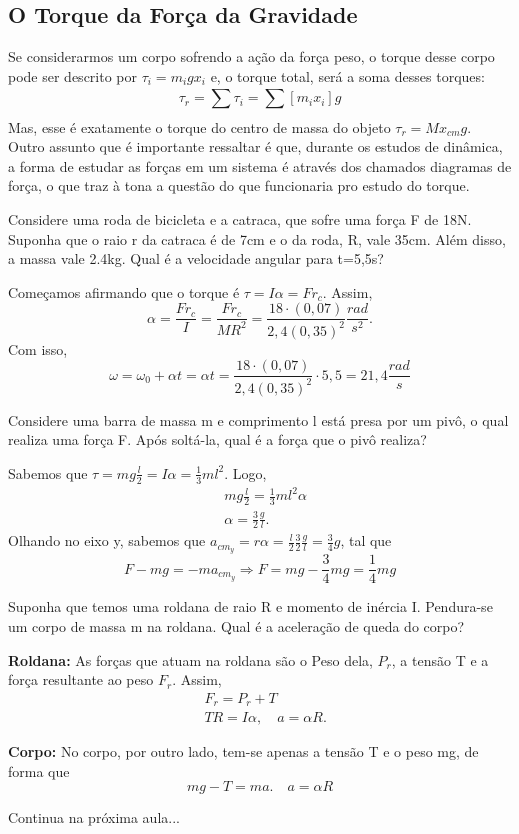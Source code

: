 \documentclass[PhysicsII/physicsII_notes.tex]{subfiles}
\begin{document}
\subsection{O Torque da Força da Gravidade}
Se considerarmos um corpo sofrendo a ação da força peso, o torque desse corpo pode ser descrito por
\(\tau_{i} = m_{i}gx_{i}\) e, o torque total, será a soma desses torques:
\[
	\tau_{r} = \sum\limits_{}^{}\tau_{i} = \sum\limits_{}^{}[m_{i}x_{i}]g
\]
Mas, esse é exatamente o torque do centro de massa do objeto \(\tau_{r} = Mx_{cm}g\). Outro assunto que é
importante ressaltar é que, durante os estudos de dinâmica, a forma de estudar as forças em um sistema é através
dos chamados diagramas de força, o que traz à tona a questão do que funcionaria pro estudo do torque.
\begin{example}
	Considere uma roda de bicicleta e a catraca, que sofre uma força F de 18N. Suponha que o raio r
	da catraca é de 7cm e o da roda, R, vale 35cm. Além disso, a massa vale 2.4kg. Qual é a velocidade angular para t=5,5s?

	Começamos afirmando que o torque é \(\tau = I\alpha = Fr_{c}\). Assim,
	\[
		\alpha = \frac{Fr_{c}}{I} = \frac{Fr_{c}}{MR^{2}} = \frac{18 \cdot (0,07)}{2,4(0,35)^{2}}\frac{rad}{s^{2}}.
	\]
	Com isso,
	\[
		\omega = \omega_{0} + \alpha t = \alpha t = \frac{18 \cdot (0,07)}{2,4(0,35)^{2}} \cdot 5,5 = 21,4 \frac{rad}{s}
	\]
\end{example}
\begin{example}
	Considere uma barra de massa m e comprimento l está presa por um pivô, o qual realiza uma força F. Após soltá-la, qual é a força que o pivô realiza?

	Sabemos que \(\tau = mg \frac{l}{2} = I\alpha = \frac{1}{3}ml^{2}.\) Logo,
	\begin{align*}
		 & mg \frac{l}{2} = \frac{1}{3}ml^{2}\alpha \\
		 & \alpha = \frac{3}{2}\frac{g}{l}.
	\end{align*}
	Olhando no eixo y, sabemos que \(a_{cm_{y}} = r\alpha  = \frac{l}{2}\frac{3}{2}\frac{g}{l} = \frac{3}{4}g\), tal que
	\[
		F - mg = -ma_{cm_y} \Rightarrow F = mg - \frac{3}{4}mg = \frac{1}{4}mg
	\]
\end{example}
\begin{example}
	Suponha que temos uma roldana de raio R e momento de inércia I. Pendura-se um corpo de massa m na roldana. Qual é a aceleração de queda do corpo?

	\textbf{Roldana:}
	As forças que atuam na roldana são o Peso dela, \(P_{r}\), a tensão T
	e a força resultante ao peso \(F_{r}\). Assim,
	\begin{align*}
		 & F_{r} = P_{r} + T                \\
		 & TR = I\alpha,\quad a = \alpha R.
	\end{align*}

	\textbf{Corpo:}
	No corpo, por outro lado, tem-se apenas a tensão T e o peso mg, de forma que
	\[
		mg-T = ma.\quad a = \alpha R
	\]
\end{example}
Continua na próxima aula...
\end{document}
